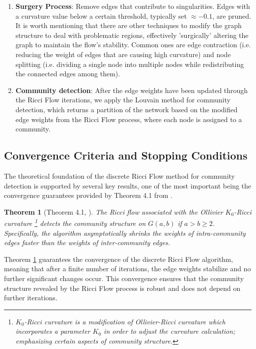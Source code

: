 \documentclass[12pt,a4paper]{article}
\newtheorem{theorem}{Theorem} %
\begin{document}
\begin{enumerate}
    \item \textbf{Surgery Process}: Remove edges that contribute to singularities. Edges with a curvature value below a certain threshold, typically set $\approx -0.1$, are pruned. It is worth mentioning that there are other techniques to modify the graph structure to deal with problematic regions, effectively 'surgically' altering the graph to maintain the flow's stability. Common ones are edge contraction (i.e. reducing the weight of edges that are causing high curvature) and node splitting (i.e. dividing a single node into multiple nodes while redistributing the connected edges among them).
    

    \item \textbf{Community detection}: After the edge weights have been updated through the Ricci Flow iterations, we apply the Louvain method for community detection, which returns a partition of the network based on the modified edge weights from the Ricci Flow process, where each node is assigned to a community.  
\end{enumerate}



\subsection{Convergence Criteria and Stopping Conditions} \label{sec2.3}
The theoretical foundation of the discrete Ricci Flow method for community detection is supported by several key results, one of the most important being the convergence guarantees provided by Theorem 4.1 from \cite{communitydetectionnetworksricci}.

\begin{theorem}[Theorem 4.1, \cite{communitydetectionnetworksricci}] \label{th1}
The Ricci flow associated with the Ollivier $K_0$-Ricci curvature \footnote{$K_0$-Ricci curvature is a modification of Ollivier-Ricci curvature which incorporates a parameter $K_0$ in order to adjust the curvature calculation; emphasizing certain aspects of community structure.} detects the community structure on $G(a, b)$ if $a > b \geq 2$. Specifically, the algorithm asymptotically shrinks the weights of intra-community edges faster than the weights of inter-community edges. %
\end{theorem}

Theorem \hyperref[th1]{1} guarantees the convergence of the discrete Ricci Flow algorithm, meaning that after a finite number of iterations, the edge weights stabilize and no further significant changes occur. This convergence ensures that the community structure revealed by the Ricci Flow process is robust and does not depend on further iterations.
\end{document}
